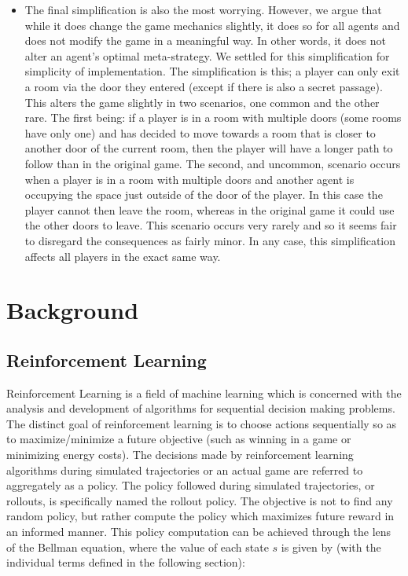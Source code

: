 \documentclass[msc, ai, logo, twoside, notimes, parskip, leftchapter, normalheadings]{infthesis}
\begin{document}
\begin{itemize}
\item The final simplification is also the most worrying. However, we argue that while it does change the game mechanics slightly, it does so for all agents and does not modify the game in a meaningful way. In other words, it does not alter an agent's optimal meta-strategy. We settled for this simplification for simplicity of implementation. The simplification is this; a player can only exit a room via the door they entered (except if there is also a secret passage). This alters the game slightly in two scenarios, one common and the other rare. The first being: if a player is in a room with multiple doors (some rooms have only one) and has decided to move towards a room that is closer to another door of the current room, then the player will have a longer path to follow than in the original game. The second, and uncommon, scenario occurs when a player is in a room with multiple doors and another agent is occupying the space just outside of the door of the player. In this case the player cannot then leave the room, whereas in the original game it could use the other doors to leave. This scenario occurs very rarely and so it seems fair to disregard the consequences as fairly minor. In any case, this simplification affects all players in the exact same way.
\end{itemize}

\chapter{Background}
\section{Reinforcement Learning}
Reinforcement Learning is a field of machine learning which is concerned with the analysis and development of algorithms for sequential decision making problems. The distinct goal of reinforcement learning is to choose actions sequentially so as to maximize/minimize a future objective (such as winning in a game or minimizing energy costs). The decisions made by reinforcement learning algorithms during simulated trajectories or an actual game are referred to aggregately as a policy. The policy followed during simulated trajectories, or rollouts, is specifically named the rollout policy. The objective is not to find any random policy, but rather compute the policy which maximizes future reward in an informed manner. This policy computation can be achieved through the lens of the Bellman equation, where the value of each state \(s\) is given by (with the individual terms defined in the following section):
\end{document}
